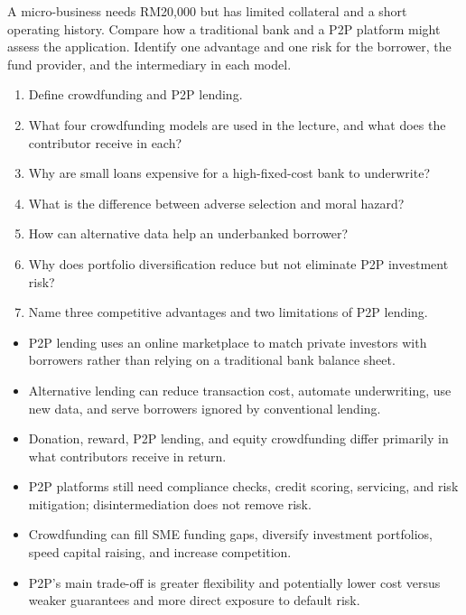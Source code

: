 \begin{tryit}
A micro-business needs RM20,000 but has limited collateral and a short operating history. Compare how a traditional bank and a P2P platform might assess the application. Identify one advantage and one risk for the borrower, the fund provider, and the intermediary in each model.
\end{tryit}

\begin{quickcheck}
\begin{enumerate}
  \item Define crowdfunding and P2P lending.
  \item What four crowdfunding models are used in the lecture, and what does the contributor receive in each?
  \item Why are small loans expensive for a high-fixed-cost bank to underwrite?
  \item What is the difference between adverse selection and moral hazard?
  \item How can alternative data help an underbanked borrower?
  \item Why does portfolio diversification reduce but not eliminate P2P investment risk?
  \item Name three competitive advantages and two limitations of P2P lending.
\end{enumerate}
\end{quickcheck}

\begin{chapterrecap}
\begin{itemize}
  \item P2P lending uses an online marketplace to match private investors with borrowers rather than relying on a traditional bank balance sheet.
  \item Alternative lending can reduce transaction cost, automate underwriting, use new data, and serve borrowers ignored by conventional lending.
  \item Donation, reward, P2P lending, and equity crowdfunding differ primarily in what contributors receive in return.
  \item P2P platforms still need compliance checks, credit scoring, servicing, and risk mitigation; disintermediation does not remove risk.
  \item Crowdfunding can fill SME funding gaps, diversify investment portfolios, speed capital raising, and increase competition.
  \item P2P's main trade-off is greater flexibility and potentially lower cost versus weaker guarantees and more direct exposure to default risk.
\end{itemize}
\end{chapterrecap}
